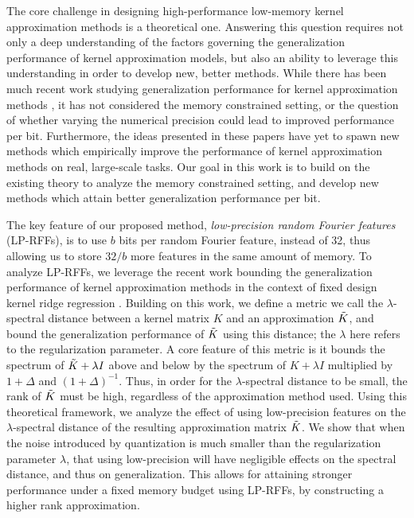 




The core challenge in designing high-performance low-memory kernel approximation methods is a theoretical one. Answering this question requires not only a deep understanding of the factors governing the generalization performance of kernel approximation models, but also an ability to leverage this understanding in order to develop new, better methods. While there has been much recent work studying generalization performance for kernel approximation methods \citep{rudi17,avron17,musco17,bach17}, it has not considered the memory constrained setting, or the question of whether varying the numerical precision could lead to improved performance per bit. Furthermore, the ideas presented in these papers have yet to spawn new methods which empirically improve the performance of kernel approximation methods on real, large-scale tasks. Our goal in this work is to build on the existing theory to analyze the memory constrained setting, and develop new methods which attain better generalization performance per bit.

The key feature of our proposed method, \textit{low-precision random Fourier features} (LP-RFFs), is to use $b$ bits per random Fourier feature, instead of 32, thus allowing us to store $32/b$ more features in the same amount of memory. To analyze LP-RFFs, we leverage the recent work bounding the generalization performance of kernel approximation methods in the context of fixed design kernel ridge regression \citep{avron17,musco17}. Building on this work, we define a metric we call the $\lambda$-spectral distance between a kernel matrix $K$ and an approximation $\tilde{K}$, and bound the generalization performance of $\tilde{K}$ using this distance; the $\lambda$ here refers to the regularization parameter. A core feature of this metric is it bounds the spectrum of $\tilde{K}+\lambda I$ above and below by the spectrum of $K+\lambda I$ multiplied by $1+\Delta$ and $(1+\Delta)^{-1}$.  Thus, in order for the $\lambda$-spectral distance to be small, the rank of $\tilde{K}$ must be high, regardless of the approximation method used. Using this theoretical framework, we analyze the effect of using low-precision features on the $\lambda$-spectral distance of the resulting approximation matrix $\tilde{K}$.  We show that when the noise introduced by quantization is much smaller than the regularization parameter $\lambda$, that using low-precision will have negligible effects on the spectral distance, and thus on generalization.  This allows for attaining stronger performance under a fixed memory budget using LP-RFFs, by constructing a higher rank approximation.


